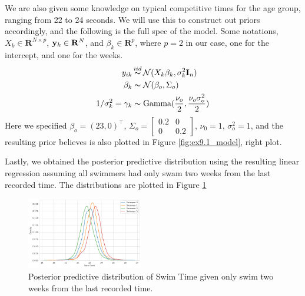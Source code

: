 \documentclass[11pt, letterpaper]{article}
\begin{document}
We are also given some knowledge on typical competitive times for the age group, ranging from 22 to 24 seconds. We will use this to construct out priors accordingly, and the following is the full spec of the model. Some notations, $X_{k} \in \mathbf{R}^{N\times p}$, $\bold{y}_k \in \mathbf{R}^N$, and $\beta_k \in \mathbf{R}^p$, where $p = 2$ in our case, one for the intercept, and one for the weeks.
\begin{align*}
    y_{ik} &\mathop{\thicksim}^{iid} \mathcal{N}(X_k \beta_k, \sigma_k^2 \mathbf{I}_n) \\
    \beta_k &\thicksim \mathcal{N}(\beta_o, \Sigma_o) \\
    1/\sigma^2_k = \gamma_k &\thicksim \text{Gamma}(\frac{\nu_o}{2}, \frac{\nu_o\sigma^2_o}{2})
\end{align*}
Here we specified $\beta_o = (23, 0)^{\intercal}$, $\Sigma_o = \begin{bmatrix}0.2 & 0 \\ 0 & 0.2\end{bmatrix}$, $\nu_0 = 1$, $\sigma^2_o = 1$, and the resulting prior believes is also plotted in Figure \ref{fig:ex9.1_model}, right plot.

\newpage
Lastly, we obtained the posterior predictive distribution using the resulting linear regression assuming all swimmers had only swam two weeks from the last recorded time. The distributions are plotted in Figure \ref{fig:ex9.1_pp}
\begin{figure}[!h]
  \centering
  \includegraphics[width=0.45\textwidth]{1.3.png}
  \captionsetup{justification=centering}
  \caption{Posterior predictive distribution of Swim Time given only swim two weeks from the last recorded time.}
  \label{fig:ex9.1_pp}
\end{figure}
\end{document}
